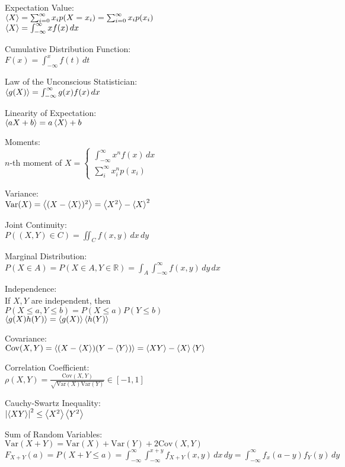 \documentclass[12pt,landscape]{article}
\newcommand{\tab}{\hspace*{1em}}
\newcommand{\ds}{\displaystyle}
\newcommand{\Var}[1]{\mathrm{Var}(#1)}
\newcommand{\Cov}[1]{\mathrm{Cov}(#1)}
\theoremstyle{definition}
\begin{document}
\begin{multicols}{3}
Expectation Value:\\
\tab $\expval{X} = \sum_{i=0}^{\infty} x_i p(X = x_i) = \sum_{i=0}^{\infty} x_i p(x_i)$\\
\tab $\expval{X} = \int_{-\infty}^\infty xf(x)\,dx$

Cumulative Distribution Function:\\
\tab $F(x) = \int_{-\infty}^{x} f(t)\,dt$

Law of the Unconscious Statistician:\\
\tab $\expval{g(X)} = \int_{-\infty}^{\infty}g(x)f(x)\,dx$

Linearity of Expectation:\\
\tab $\expval{aX+b} = a\expval{X} + b$

Moments:\\
\tab $n$-th moment of $X = \begin{cases}
\int_{-\infty}^{\infty}x^n f(x)\,dx & \,\\
\sum_{i}^{\infty} x_i^n p(x_i) & \,
\end{cases}$

Variance:\\
\tab $\Var{X} = \expval{(X-\expval{X})^2} = \expval{X^2} - \expval{X}^2$

Joint Continuity:\\
\tab $P((X,Y)\in C) = \iint_C f(x,y)\,dx\,dy$

Marginal Distribution:\\
\tab $P(X\in A) = P(X \in A, Y \in \mathbb{R}) = \int_A \int_{-\infty}^{\infty}f(x,y)\,dy\,dx$

Independence:\\
If $X,Y$ are independent, then\\
\tab $P(X\leq a, Y\leq b) = P(X\leq a)P(Y\leq b)$\\
\tab $\expval{g(X)h(Y)} = \expval{g(X)}\expval{h(Y)}$

Covariance:\\
\tab $\Cov{X,Y} = \expval{(X-\expval{X})(Y-\expval{Y})} = \expval{XY} - \expval{X}\expval{Y}$

Correlation Coefficient:\\
\tab $\ds \rho(X,Y) = \frac{\Cov{X,Y}}{\sqrt{\Var{X}\Var{Y}}} \in [-1,1]$

Cauchy-Swartz Inequality:\\
\tab $\abs{\expval{XY}}^2 \leq \expval{X^2}\expval{Y^2}$

Sum of Random Variables:\\
\tab $\Var{X+Y} = \Var{X} + \Var{Y} + 2\Cov{X,Y}$\\
\tab $\ds F_{X+Y}(a) = P(X+Y \leq a) = \int_{-\infty}^{\infty}\int_{-\infty}^{x+y}f_{X+Y}(x,y)\,dx\,dy = \int_{-\infty}^{\infty}f_x(a-y)f_Y(y)\,dy$


\end{multicols}
\end{document}
